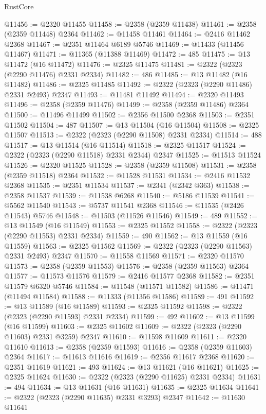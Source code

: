\begin{lexlean}{RustCore}
\begin{coremodule}
@11456 := @2320 @11455
@11458 := @2358 (@2359 @11438)
@11461 := @2358 (@2359 @11448) @2364
@11462 := @11458 @11461
@11464 := @2416 @11462 @2368
@11467 := @2351 @11464 @6189 @5746
@11469 := @11433 (@11456 @11467)
@11471 := @11365 (@11388 @11469)
@11472 := 485
@11475 := @13 @11472 (@16 @11472)
@11476 := @2325 @11475
@11481 := @2322 (@2323 (@2290 @11476) @2331 @2334)
@11482 := 486
@11485 := @13 @11482 (@16 @11482)
@11486 := @2325 @11485
@11492 := @2322 (@2323 (@2290 @11486) @2331 @2493) @2347
@11493 := @11481 @11492
@11494 := @2320 @11493
@11496 := @2358 (@2359 @11476)
@11499 := @2358 (@2359 @11486) @2364
@11500 := @11496 @11499
@11502 := @2356 @11500 @2368
@11503 := @2351 @11502
@11504 := 487
@11507 := @13 @11504 (@16 @11504)
@11508 := @2325 @11507
@11513 := @2322 (@2323 (@2290 @11508) @2331 @2334)
@11514 := 488
@11517 := @13 @11514 (@16 @11514)
@11518 := @2325 @11517
@11524 := @2322 (@2323 (@2290 @11518) @2331 @2344) @2347
@11525 := @11513 @11524
@11526 := @2320 @11525
@11528 := @2358 (@2359 @11508)
@11531 := @2358 (@2359 @11518) @2364
@11532 := @11528 @11531
@11534 := @2416 @11532 @2368
@11535 := @2351 @11534
@11537 := @2341 (@2342 @363)
@11538 := @2358 @11537
@11539 := @11538 @6268
@11540 := @5186 @11539
@11541 := @5562 @11540
@11543 := @5737 @11541 @2368
@11546 := @11535 (@2426 @11543) @5746
@11548 := @11503 (@11526 @11546)
@11549 := 489
@11552 := @13 @11549 (@16 @11549)
@11553 := @2325 @11552
@11558 := @2322 (@2323 (@2290 @11553) @2331 @2334)
@11559 := 490
@11562 := @13 @11559 (@16 @11559)
@11563 := @2325 @11562
@11569 := @2322 (@2323 (@2290 @11563) @2331 @2493) @2347
@11570 := @11558 @11569
@11571 := @2320 @11570
@11573 := @2358 (@2359 @11553)
@11576 := @2358 (@2359 @11563) @2364
@11577 := @11573 @11576
@11579 := @2416 @11577 @2368
@11582 := @2351 @11579 @6320 @5746
@11584 := @11548 (@11571 @11582)
@11586 := @11471 (@11494 @11584)
@11588 := @11333 (@11356 @11586)
@11589 := 491
@11592 := @13 @11589 (@16 @11589)
@11593 := @2325 @11592
@11598 := @2322 (@2323 (@2290 @11593) @2331 @2334)
@11599 := 492
@11602 := @13 @11599 (@16 @11599)
@11603 := @2325 @11602
@11609 := @2322 (@2323 (@2290 @11603) @2331 @3259) @2347
@11610 := @11598 @11609
@11611 := @2320 @11610
@11613 := @2358 (@2359 @11593)
@11616 := @2358 (@2359 @11603) @2364
@11617 := @11613 @11616
@11619 := @2356 @11617 @2368
@11620 := @2351 @11619
@11621 := 493
@11624 := @13 @11621 (@16 @11621)
@11625 := @2325 @11624
@11630 := @2322 (@2323 (@2290 @11625) @2331 @2334)
@11631 := 494
@11634 := @13 @11631 (@16 @11631)
@11635 := @2325 @11634
@11641 := @2322 (@2323 (@2290 @11635) @2331 @3293) @2347
@11642 := @11630 @11641

\end{coremodule}
\end{lexlean}
